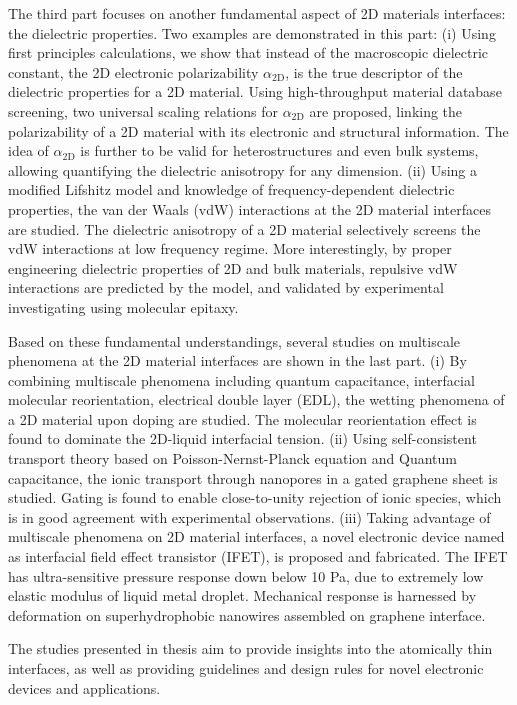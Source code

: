 The third part focuses on another fundamental aspect of 2D materials
interfaces: the dielectric properties.
%
%
Two examples are
demonstrated in this part:
%
(i) Using first principles calculations, we show that instead of the
macroscopic dielectric constant, the 2D electronic polarizability
$\alpha_{\mathrm{2D}}$, is the true descriptor of the dielectric
properties for a 2D material.  Using high-throughput material database
screening, two universal scaling relations for $\alpha_{\mathrm{2D}}$
are proposed, linking the polarizability of a 2D material with its
electronic and structural information.
%
The idea
of $\alpha_{\mathrm{2D}}$ is further to be valid for heterostructures
and even bulk systems, allowing quantifying the dielectric anisotropy
for any dimension.
%
(ii) Using a modified Lifshitz model and knowledge of
frequency-dependent dielectric properties, the van der Waals (vdW)
interactions at the 2D material interfaces are studied.
The 
dielectric anisotropy of a 2D material selectively screens the vdW
interactions at low frequency regime. More interestingly, by proper
engineering dielectric properties of 2D and bulk materials, repulsive
vdW interactions are predicted by the model, and validated by
experimental investigating using molecular epitaxy.

Based on these fundamental understandings, several
studies on multiscale phenomena at the 2D material interfaces are
shown in the last part.
%
(i) By combining multiscale phenomena including quantum capacitance,
interfacial molecular reorientation, electrical double layer (EDL),
the wetting phenomena of a 2D material upon doping are studied. The
molecular reorientation effect is found to dominate the 2D-liquid
interfacial tension.
%
(ii) Using self-consistent transport theory based on
Poisson-Nernst-Planck equation and Quantum capacitance, the ionic
transport through nanopores in a gated graphene sheet is
studied. Gating is found to enable close-to-unity rejection of ionic
species, which is in good agreement with experimental observations.
%
(iii) Taking advantage of multiscale phenomena on 2D material
interfaces, a novel electronic device named as interfacial field
effect transistor (IFET), is proposed and fabricated. The IFET has
ultra-sensitive pressure response down below 10 Pa, due to extremely low
elastic modulus of liquid metal droplet. Mechanical response is
harnessed by deformation on superhydrophobic nanowires assembled on
graphene interface.

The studies presented in thesis aim to provide insights into the
atomically thin interfaces, as well as providing guidelines and design
rules for novel electronic devices and applications.


